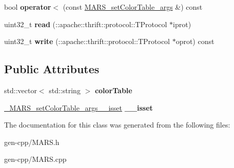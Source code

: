 \begin{DoxyCompactItemize}
\item 
\mbox{\label{classMARS_1_1MARS__setColorTable__args_a184dd9bf9d2eaacb2599664927f03160}} 
bool {\bfseries operator$<$} (const \hyperlink{classMARS_1_1MARS__setColorTable__args}{M\+A\+R\+S\+\_\+set\+Color\+Table\+\_\+args} \&) const
\item 
\mbox{\label{classMARS_1_1MARS__setColorTable__args_ae3b3aead9a97b2578824e1a9b0d5d3f2}} 
uint32\+\_\+t {\bfseries read} (\+::apache\+::thrift\+::protocol\+::\+T\+Protocol $\ast$iprot)
\item 
\mbox{\label{classMARS_1_1MARS__setColorTable__args_a232c14802cc0674a5ab14464de2f1f1a}} 
uint32\+\_\+t {\bfseries write} (\+::apache\+::thrift\+::protocol\+::\+T\+Protocol $\ast$oprot) const
\end{DoxyCompactItemize}
\subsection*{Public Attributes}
\begin{DoxyCompactItemize}
\item 
\mbox{\label{classMARS_1_1MARS__setColorTable__args_a2d11aa343787d6be478c7edd1b8586aa}} 
std\+::vector$<$ std\+::string $>$ {\bfseries color\+Table}
\item 
\mbox{\label{classMARS_1_1MARS__setColorTable__args_a45a84714b423639754993e15200b76ab}} 
\hyperlink{structMARS_1_1__MARS__setColorTable__args____isset}{\+\_\+\+M\+A\+R\+S\+\_\+set\+Color\+Table\+\_\+args\+\_\+\+\_\+isset} {\bfseries \+\_\+\+\_\+isset}
\end{DoxyCompactItemize}


The documentation for this class was generated from the following files\+:\begin{DoxyCompactItemize}
\item 
gen-\/cpp/M\+A\+R\+S.\+h\item 
gen-\/cpp/M\+A\+R\+S.\+cpp\end{DoxyCompactItemize}

